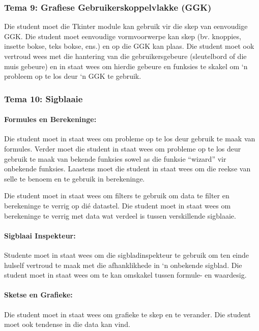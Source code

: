         \subsubsection{Tema 9: Grafiese Gebruikerskoppelvlakke (GGK)}
            Die student moet die Tkinter module kan gebruik vir die skep van
            eenvoudige GGK. Die student moet eenvoudige vormvoorwerpe kan skep
            (bv. knoppies, insette bokse, teks bokse, ens.) en op die GGK kan
            plaas. Die student moet ook vertroud wees met die hantering van die
            gebruikersgebeure (sleutelbord of die muis gebeure) en in staat
            wees om hierdie gebeure en funksies te skakel om `n probleem op te
            los deur `n GGK te gebruik.

        \subsubsection{Tema 10: Sigblaaie}
            \paragraph{Formules en Berekeninge:}
                Die student moet in staat wees om probleme op te los deur
                gebruik te maak van formules. Verder moet die student in staat
                wees om probleme op te los deur gebruik te maak van bekende
                funksies sowel as die funksie ``wizard'' vir onbekende
                funksies.  Laastens moet die student in staat wees om die
                reekse van selle te benoem en te gebruik in berekeninge.

                Die student moet in staat wees om filters te gebruik om data te
                filter en berekeninge te verrig op di\'{e} datastel.  Die
                student moet in staat wees om berekeninge te verrig met data
                wat verdeel is tussen verskillende sigblaaie.

            \paragraph{Sigblaai Inspekteur:}
                Studente moet in staat wees om die sigbladinspekteur te gebruik
                om ten einde hulself vertroud te maak met die afhanklikhede in
                `n onbekende sigblad.  Die student moet in staat wees om te kan
                omskakel tussen formule- en waardesig.

            \paragraph{Sketse en Grafieke:}
                Die student moet in staat wees om grafieke te skep en te
                verander.  Die student moet ook tendense in die data kan vind.

